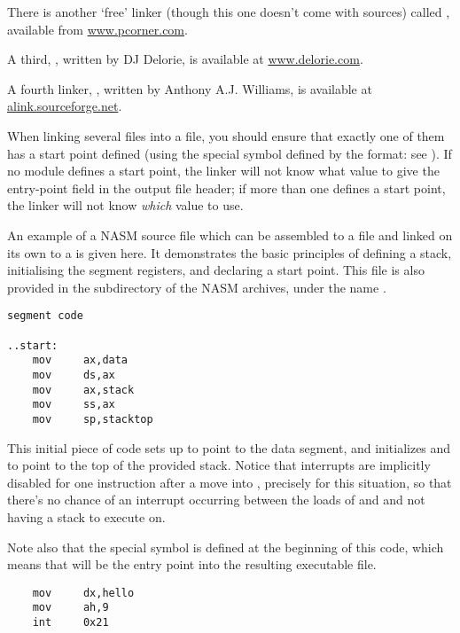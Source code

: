 There is another `free' linker (though this one doesn't come with
sources) called , available from
\href{http://www.pcorner.com/tpc/old/3-101.html}{www.pcorner.com}.

A third, , written by DJ Delorie, is available at
\href{http://www.delorie.com/djgpp/16bit/djlink/}{www.delorie.com}.

A fourth linker, , written by Anthony A.J. Williams, is
available at \href{http://alink.sourceforge.net}{alink.sourceforge.net}.

When linking several  files into a  file, you should
ensure that exactly one of them has a start point defined (using the
 special symbol defined by the
 format: see ). If no module defines a start
point, the linker will not know what value to give the entry-point
field in the output file header; if more than one defines a start
point, the linker will not know \emph{which} value to use.

An example of a NASM source file which can be assembled to a
 file and linked on its own to a  is given here. It
demonstrates the basic principles of defining a stack, initialising
the segment registers, and declaring a start point. This file is
also provided in the  subdirectory of
the NASM archives, under the name .

\begin{lstlisting}
segment code

..start:
    mov     ax,data
    mov     ds,ax
    mov     ax,stack
    mov     ss,ax
    mov     sp,stacktop
\end{lstlisting}

This initial piece of code sets up  to point to the data
segment, and initializes  and  to point to the top of
the provided stack. Notice that interrupts are implicitly disabled
for one instruction after a move into , precisely for this
situation, so that there's no chance of an interrupt occurring
between the loads of  and  and not having a stack to
execute on.

Note also that the special symbol  is defined at the
beginning of this code, which means that will be the entry point
into the resulting executable file.

\begin{lstlisting}
    mov     dx,hello
    mov     ah,9
    int     0x21
\end{lstlisting}

